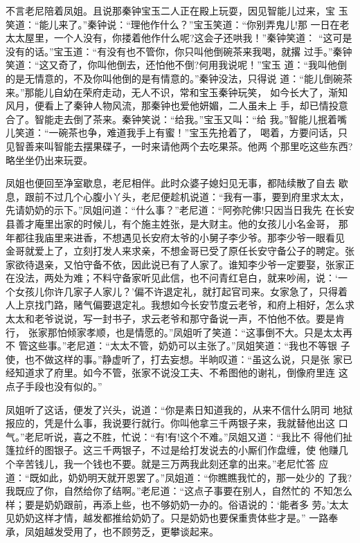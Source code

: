 不言老尼陪着凤姐。且说那秦钟宝玉二人正在殿上玩耍，因见智能儿过来，宝
玉笑道：“能儿来了。”秦钟说：“理他作什么？”宝玉笑道：“你别弄鬼儿!那
一日在老太太屋里，一个人没有，你搂着他作什么呢?这会子还哄我！”秦钟笑道：
“这可是没有的话。”宝玉道：“有没有也不管你，你只叫他倒碗茶来我喝，就撂
过手。”秦钟笑道：“这又奇了，你叫他倒去，还怕他不倒?何用我说呢！”宝玉
道：“我叫他倒的是无情意的，不及你叫他倒的是有情意的。”秦钟没法，只得说
道：“能儿倒碗茶来。”那能儿自幼在荣府走动，无人不识，常和宝玉秦钟玩笑，
如今长大了，渐知风月，便看上了秦钟人物风流，那秦钟也爱他妍媚，二人虽未上
手，却已情投意合了。智能走去倒了茶来。秦钟笑说：“给我。”宝玉又叫：“给
我。”智能儿抿着嘴儿笑道：“一碗茶也争，难道我手上有蜜！”宝玉先抢着了，
喝着，方要问话，只见智善来叫智能去摆果碟子，一时来请他两个去吃果茶。他两
个那里吃这些东西?略坐坐仍出来玩耍。

凤姐也便回至净室歇息，老尼相伴。此时众婆子媳妇见无事，都陆续散了自去
歇息，跟前不过几个心腹小丫头，老尼便趁机说道：“我有一事，要到府里求太太，
先请奶奶的示下。”凤姐问道：“什么事？”老尼道：“阿弥陀佛!只因当日我先
在长安县善才庵里出家的时候儿，有个施主姓张，是大财主。他的女孩儿小名金哥，
那年都往我庙里来进香，不想遇见长安府太爷的小舅子李少爷。那李少爷一眼看见
金哥就爱上了，立刻打发人来求亲，不想金哥已受了原任长安守备公子的聘定。张
家欲待退亲，又怕守备不依，因此说已有了人家了。谁知李少爷一定要娶，张家正
在没法，两处为难；不料守备家听见此信，也不问青红皂白，就来吵闹，说：‘一
个女孩儿你许几家子人家儿？’偏不许退定礼，就打起官司来。女家急了，只得着
人上京找门路，赌气偏要退定礼。我想如今长安节度云老爷，和府上相好，怎么求
太太和老爷说说，写一封书子，求云老爷和那守备说一声，不怕他不依。要是肯行，
张家那怕倾家孝顺，也是情愿的。”凤姐听了笑道：“这事倒不大。只是太太再不
管这些事。”老尼道：“太太不管，奶奶可以主张了。”凤姐笑道：“我也不等银
子使，也不做这样的事。”静虚听了，打去妄想。半晌叹道：“虽这么说，只是张
家已经知道求了府里。如今不管，张家不说没工夫、不希图他的谢礼，倒像府里连
这点子手段也没有似的。”

凤姐听了这话，便发了兴头，说道：“你是素日知道我的，从来不信什么阴司
地狱报应的，凭是什么事，我说要行就行。你叫他拿三千两银子来，我就替他出这
口气。”老尼听说，喜之不胜，忙说：“有!有!这个不难。”凤姐又道：“我比不
得他们扯篷拉纤的图银子。这三千两银子，不过是给打发说去的小厮们作盘缠，使
他赚几个辛苦钱儿，我一个钱也不要。就是三万两我此刻还拿的出来。”老尼忙答
应道：“既如此，奶奶明天就开恩罢了。”凤姐道：“你瞧瞧我忙的，那一处少的
了我?我既应了你，自然给你了结啊。”老尼道：“这点子事要在别人，自然忙的
不知怎么样；要是奶奶跟前，再添上些，也不够奶奶一办的。俗语说的：‘能者多
劳。’太太见奶奶这样才情，越发都推给奶奶了。只是奶奶也要保重贵体些才是。”
一路奉承，凤姐越发受用了，也不顾劳乏，更攀谈起来。

